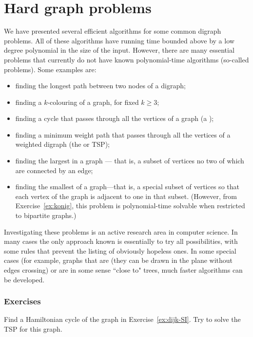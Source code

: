 \chapter{Hard graph problems}
\label{sec:hardgraph}
We have presented several efficient algorithms for some common digraph
problems. All of these algorithms have running time bounded above by a low
degree polynomial in the size of the input. However, there are many
essential problems that currently do not have known polynomial-time
algorithms (so-called  problems). Some examples
are:
\begin{itemize}
\item finding the longest path between two nodes of
a digraph;
\item finding a $k$-colouring of a graph, for fixed $k\geq
3$;
\item finding a cycle that passes through all the vertices of
a graph (a );
\item finding a
minimum weight path that passes through all the vertices of a weighted
digraph (the  or TSP);
\item finding the largest  in a graph --- that is, 
a subset of vertices no two of which are connected by an edge;
\item finding the smallest 
 of a graph---that is, a special subset of
vertices so that each vertex of the graph is adjacent to one in that
subset. (However, from Exercise~\ref{ex:konig}, this problem 
is polynomial-time solvable when restricted to bipartite graphs.)

\end{itemize}

Investigating these problems is an active research area in computer
science. In many cases the only approach known is essentially to try
all possibilities, with some rules that prevent the listing of obviously
hopeless ones. In some special cases (for example, graphs that are 
 (they can be drawn in the plane without edges crossing) 
or are in some sense ``close to" trees, much faster algorithms can be developed.

\subsection*{Exercises}

\begin{Exercise}\label{exr:tsp}
Find a Hamiltonian cycle of the graph in Exercise~\ref{ex:dijk-SI}. Try to solve
the TSP for this graph.
\end{Exercise}

